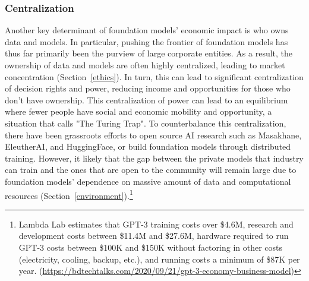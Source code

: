 \subsubsection{Centralization}
\label{sec:economics-centralization}
Another key determinant of foundation models' economic impact is who owns data and models. In particular, pushing the frontier of foundation models has thus far primarily been the purview of large corporate entities. As a result, the ownership of data and models are often highly centralized, leading to market concentration (Section~\ref{ethics}).  
In turn, this can lead to significant centralization of decision rights and power, reducing income and opportunities for those who don't have ownership. This centralization of power can lead to an equilibrium where fewer people have social and economic mobility and opportunity, a situation that   \citet{Brynjolfsson2022inpress} calls "The Turing Trap". To counterbalance this centralization, there have been grassroots efforts to open source AI research such as Masakhane, EleutherAI, and HuggingFace, or build foundation models through distributed training. However, it likely that the gap between the private models that industry can train and the ones that are open to the community will remain large due to foundation models' dependence on massive amount of data and computational resources (Section~\ref{environment}).\footnote{Lambda Lab estimates that GPT-3 training costs over \$4.6M, research and development costs between \$11.4M and \$27.6M, hardware required to run GPT-3 costs between \$100K and \$150K without factoring in other costs (electricity, cooling, backup, etc.), and running costs a minimum of \$87K per year. (\url{https://bdtechtalks.com/2020/09/21/gpt-3-economy-business-model})}

